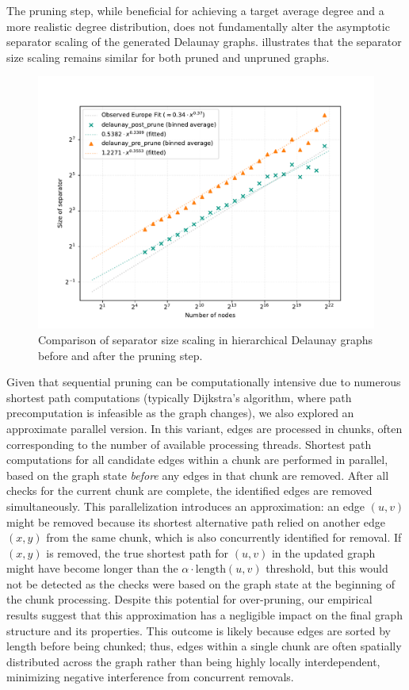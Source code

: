 The pruning step, while beneficial for achieving a target average degree and a more realistic degree distribution, does not fundamentally alter the asymptotic separator scaling of the generated Delaunay graphs.
 illustrates that the separator size scaling remains similar for both pruned and unpruned graphs.

\begin{figure}[tbhp]
	\centering
	\includegraphics[width=0.7\linewidth]{graphics/delaunay_pre_post_pruning_sep_size.pdf}
	\caption{Comparison of separator size scaling in hierarchical Delaunay graphs before and after the pruning step.}
	\label{fig:delaunay_pruned_vs_pre_pruned_sep}
\end{figure}

Given that sequential pruning can be computationally intensive due to numerous shortest path computations (typically Dijkstra's algorithm, where path precomputation is infeasible as the graph changes), we also explored an approximate parallel version.
In this variant, edges are processed in chunks, often corresponding to the number of available processing threads.
Shortest path computations for all candidate edges within a chunk are performed in parallel, based on the graph state \emph{before} any edges in that chunk are removed.
After all checks for the current chunk are complete, the identified edges are removed simultaneously.
This parallelization introduces an approximation: an edge \((u,v)\) might be removed because its shortest alternative path relied on another edge \((x,y)\) from the same chunk, which is also concurrently identified for removal.
If \((x,y)\) is removed, the true shortest path for \((u,v)\) in the updated graph might have become longer than the \(\alpha \cdot \text{length}(u,v)\) threshold, but this would not be detected as the checks were based on the graph state at the beginning of the chunk processing.
Despite this potential for over-pruning, our empirical results suggest that this approximation has a negligible impact on the final graph structure and its properties.
This outcome is likely because edges are sorted by length before being chunked; thus, edges within a single chunk are often spatially distributed across the graph rather than being highly locally interdependent, minimizing negative interference from concurrent removals.

